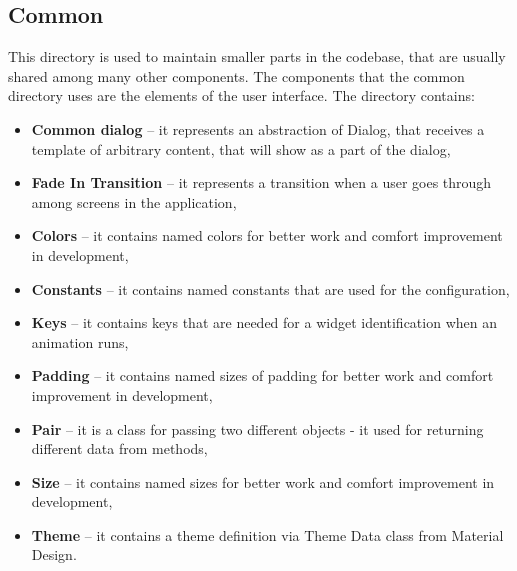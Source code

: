 \subsection{Common}\label{subsec:common}
This directory is used to maintain smaller parts in the codebase, that are usually shared among many other components.
The components that the common directory uses are the elements of the user interface.
The directory contains:
\begin{itemize}
    \item \textbf{Common dialog} -- it represents an abstraction of Dialog, that receives a template of arbitrary content, that will show as a part of the dialog,
    \item \textbf{Fade In Transition} -- it represents a transition when a user goes through among screens in the application,
    \item \textbf{Colors} -- it contains named colors for better work and comfort improvement in development,
    \item \textbf{Constants} -- it contains named constants that are used for the configuration,
    \item \textbf{Keys} -- it contains keys that are needed for a widget identification when an animation runs,
    \item \textbf{Padding} -- it contains named sizes of padding for better work and comfort improvement in development,
    \item \textbf{Pair} -- it is a class for passing two different objects - it used for returning different data from methods,
    \item \textbf{Size} -- it contains named sizes for better work and comfort improvement in development,
    \item \textbf{Theme} -- it contains a theme definition via Theme Data class from Material Design.
\end{itemize}
